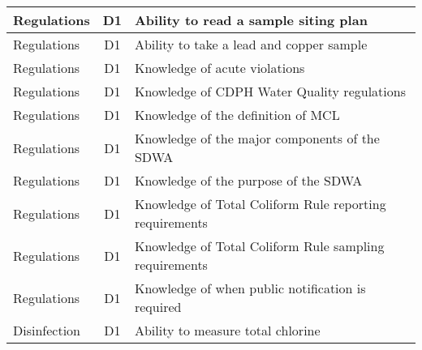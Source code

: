 \documentclass{article}
\begin{document}
\begin{table}[]
\begin{tabular}{|l|c|l|}
Regulations                            & D1             & Ability to read a   sample siting plan                                                                                            \\ \hline
Regulations                            & D1             & Ability to take a   lead and copper sample                                                                                        \\ \hline
Regulations                            & D1             & Knowledge of acute   violations                                                                                                   \\ \hline
Regulations                            & D1             & Knowledge of CDPH   Water Quality regulations                                                                                     \\ \hline
Regulations                            & D1             & Knowledge of the   definition of MCL                                                                                              \\ \hline
Regulations                            & D1             & Knowledge of the   major components of the SDWA                                                                                   \\ \hline
Regulations                            & D1             & Knowledge of the   purpose of the SDWA                                                                                            \\ \hline
Regulations                            & D1             & Knowledge of Total   Coliform Rule reporting requirements                                                                         \\ \hline
Regulations                            & D1             & Knowledge of Total   Coliform Rule sampling requirements                                                                          \\ \hline
Regulations                            & D1             & Knowledge of when   public notification is required                                                                               \\ \hline
Disinfection                           & D1             & Ability to measure   total chlorine                                                                                               \\ \hline

\end{tabular}
\end{table}
\end{document}
